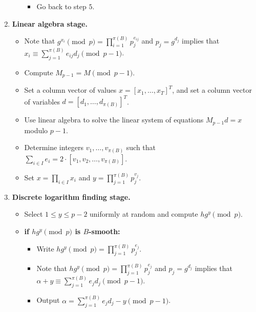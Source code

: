 \begin{algo}
\begin{enumerate}[1.]
\begin{itemize}
\begin{itemize}
                                    \item Go back to step $5$. 
                              \end{itemize}
                  \end{itemize}
            \item {\bf Linear algebra stage.} 
                  \begin{itemize}
                        \item Note that $g^{x_i} \pmod p = \prod_{i=1}^{\pi(B)} p_j^{e_{ij}}$ and $p_j = g^{d_j}$ 
                              implies that $x_i \equiv \sum_{j=1}^{\pi(B)} e_{ij} d_j \pmod{p-1}$. 
                        \item Compute $M_{p-1} = M \pmod{p-1}$. 
                        \item Set a column vector of values $x = [x_1, \dots, x_T]^T$, and set a column vector of 
                              variables $d = [d_1, \dots, d_{\pi(B)}]^T$. 
                        \item Use linear algebra to solve the linear system of equations $M_{p-1}d = x$ modulo $p-1$. 
                        \item Determine integers $v_1, \dots, v_{\pi(B)}$ such that $\sum_{i\in I} e_i = 2 \cdot 
                              [v_1, v_2, \dots, v_{\pi(B)}]$. 
                        \item Set $x = \prod_{i\in I} x_i$ and $y = \prod_{j=1}^{\pi(B)} p_j^{v_j}$. 
                  \end{itemize}
            \item {\bf Discrete logarithm finding stage.} 
                  \begin{itemize}
                        \item Select $1 \leq y \leq p-2$ uniformly at random and compute $hg^y \pmod p$. 
                        \item {\bf if $hg^y \pmod p$ is $B$-smooth:} 
                              \begin{itemize}
                                    \item Write $hg^y \pmod p = \prod_{j=1}^{\pi(B)} p_j^{e_j}$. 
                                    \item Note that $hg^y \pmod p = \prod_{j=1}^{\pi(B)} p_j^{e_j}$ and $p_j = g^{d_j}$ 
                                          implies that $\alpha + y \equiv \sum_{j=1}^{\pi(B)} e_j d_j \pmod{p-1}$. 
                                    \item Output $\alpha = \sum_{j=1}^{\pi(B)} e_j d_j - y \pmod{p-1}$. 

\end{itemize}
\end{itemize}
\end{enumerate}
\end{algo}
